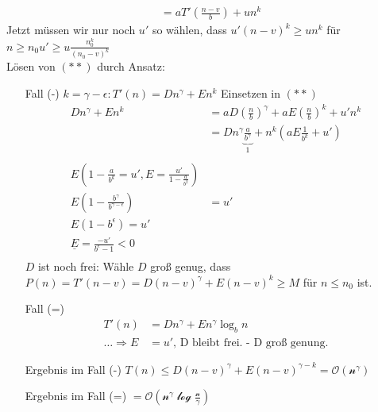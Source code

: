 \begin{enumerate}
\begin{enumerate}
\begin{align*}
&= a T'(\frac{n-v}{b}) + un^k
\end{align*} 
Jetzt müssen wir nur noch $u'$ so wählen, dass $u'(n-v)^k \geq u n^k$ für $n \geq n_0 u'\geq u \frac{n_{0}^k}{(n_0-v)^k}$\\
Lösen von $(**)$ durch Ansatz:
\begin{enumerate}
\item[Fall (-)] $k = \gamma - \epsilon: T'(n) = D n^\gamma + En^k$
Einsetzen in $(**)$
\begin{align*}
Dn^\gamma + En^k &= aD(\frac{n}{b})^\gamma + aE(\frac{n}{b})^k + u'n^k\\
&= Dn^\gamma \underbrace{\frac{a}{b^\gamma}}_{1} + n^k(aE \frac{1}{b^k} + u')\\
\\
E(1-\frac{a}{b^k} = u', E = \frac{u'}{1-\frac{a}{b^2}})&\\
E(1-\frac{b^\gamma}{b^{\gamma - \epsilon}}) &= u'\\
E (1-b^\epsilon) = u'\\
\underline{E} = \frac{-u'}{b^\epsilon -1} < 0\\
\end{align*}
$D$ ist noch frei: Wähle $D$ groß genug, dass $P(n) = T'(n-v) = D(n-v)^\gamma + E(n-v)^k \geq M$ für $n \leq n_0$ ist.
\item[Fall (=)]
\begin{align*}
T'(n) &= D n^\gamma + En^\gamma \log_b n\\
\dots \Rightarrow E &= u'\text{, D bleibt frei. - D groß genung.}
\end{align*}
\item[Ergebnis im Fall (-)]$T(n) \leq D(n-v)^\gamma + E(n-v)^{\gamma-k} = \mathcal{O(n^\gamma)}$
\item[Ergebnis im Fall (=)] $= \mathcal{O(n^\gamma \log \frac{n}{\gamma})}$
\end{enumerate}
\end{enumerate}
\end{enumerate}

